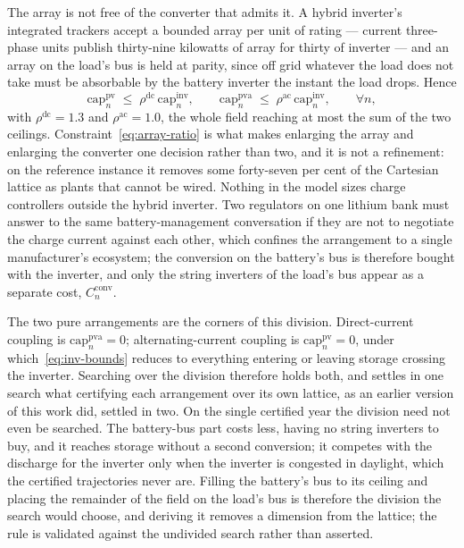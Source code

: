 \documentclass[11pt,a4paper]{article}
\theoremstyle{plain}
\theoremstyle{definition}
\begin{document}
The array is not free of the converter that admits it. A hybrid inverter's integrated
trackers accept a bounded array per unit of rating --- current three-phase units publish
thirty-nine kilowatts of array for thirty of inverter --- and an array on the load's bus is
held at parity, since off grid whatever the load does not take must be absorbable by the
battery inverter the instant the load drops. Hence
\begin{equation}
  \mathrm{cap}^{\mathrm{pv}}_n \;\leq\; \rho^{\mathrm{dc}}\, \mathrm{cap}^{\mathrm{inv}}_n,
  \qquad
  \mathrm{cap}^{\mathrm{pva}}_n \;\leq\; \rho^{\mathrm{ac}}\, \mathrm{cap}^{\mathrm{inv}}_n,
  \qquad \forall n,
  \label{eq:array-ratio}
\end{equation}
with $\rho^{\mathrm{dc}}=1.3$ and $\rho^{\mathrm{ac}}=1.0$, the whole field reaching at most
the sum of the two ceilings. Constraint~\eqref{eq:array-ratio} is what makes enlarging the
array and enlarging the converter one decision rather than two, and it is not a refinement:
on the reference instance it removes some forty-seven per cent of the Cartesian lattice as
plants that cannot be wired. Nothing in the model sizes charge controllers outside the
hybrid inverter. Two regulators on one lithium bank must answer to the same
battery-management conversation if they are not to negotiate the charge current against
each other, which confines the arrangement to a single manufacturer's ecosystem; the
conversion on the battery's bus is therefore bought with the inverter, and only the string
inverters of the load's bus appear as a separate cost, $C^{\mathrm{conv}}_n$.

The two pure arrangements are the corners of this division. Direct-current coupling is
$\mathrm{cap}^{\mathrm{pva}}_n=0$; alternating-current coupling is
$\mathrm{cap}^{\mathrm{pv}}_n=0$, under which~\eqref{eq:inv-bounds} reduces to everything
entering or leaving storage crossing the inverter. Searching over the division therefore
holds both, and settles in one search what certifying each arrangement over its own lattice,
as an earlier version of this work did, settled in two. On the single certified year the
division need not even be searched. The battery-bus part costs less, having no string
inverters to buy, and it reaches storage without a second conversion; it competes with the
discharge for the inverter only when the inverter is congested in daylight, which the
certified trajectories never are. Filling the battery's bus to its ceiling and placing the
remainder of the field on the load's bus is therefore the division the search would choose,
and deriving it removes a dimension from the lattice; the rule is validated against the
undivided search rather than asserted.
\end{document}
